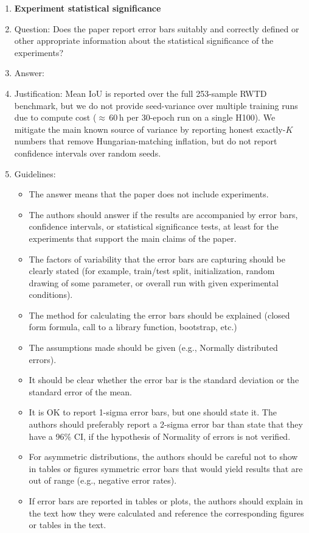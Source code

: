 \begin{enumerate}
\item {\bf Experiment statistical significance}
    \item[] Question: Does the paper report error bars suitably and correctly defined or other appropriate information about the statistical significance of the experiments?
    \item[] Answer: \answerNo{}
    \item[] Justification: Mean IoU is reported over the full 253-sample RWTD benchmark, but we do not provide seed-variance over multiple training runs due to compute cost ($\approx\,60$\,h per 30-epoch run on a single H100). We mitigate the main known source of variance by reporting honest exactly-$K$ numbers that remove Hungarian-matching inflation, but do not report confidence intervals over random seeds.
    \item[] Guidelines:
    \begin{itemize}
        \item The answer \answerNA{} means that the paper does not include experiments.
        \item The authors should answer \answerYes{} if the results are accompanied by error bars, confidence intervals, or statistical significance tests, at least for the experiments that support the main claims of the paper.
        \item The factors of variability that the error bars are capturing should be clearly stated (for example, train/test split, initialization, random drawing of some parameter, or overall run with given experimental conditions).
        \item The method for calculating the error bars should be explained (closed form formula, call to a library function, bootstrap, etc.)
        \item The assumptions made should be given (e.g., Normally distributed errors).
        \item It should be clear whether the error bar is the standard deviation or the standard error of the mean.
        \item It is OK to report 1-sigma error bars, but one should state it. The authors should preferably report a 2-sigma error bar than state that they have a 96\% CI, if the hypothesis of Normality of errors is not verified.
        \item For asymmetric distributions, the authors should be careful not to show in tables or figures symmetric error bars that would yield results that are out of range (e.g., negative error rates).
        \item If error bars are reported in tables or plots, the authors should explain in the text how they were calculated and reference the corresponding figures or tables in the text.
    \end{itemize}


\end{enumerate}
